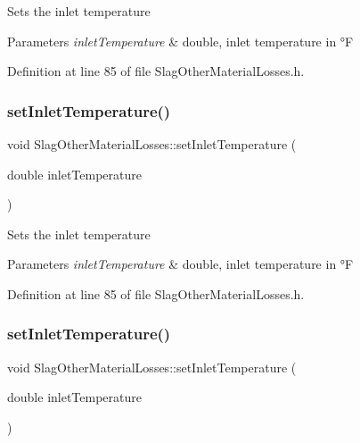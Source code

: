 Sets the inlet temperature 
\begin{DoxyParams}{Parameters}
{\em inlet\+Temperature} & double, inlet temperature in °F \\
\hline
\end{DoxyParams}


Definition at line 85 of file Slag\+Other\+Material\+Losses.\+h.

\mbox{\label{class_slag_other_material_losses_a47bb0a61de501e3e9b7bd2bf2651eb8c}} 
\subsubsection{\texorpdfstring{set\+Inlet\+Temperature()}{setInletTemperature()}\hspace{0.1cm}{\footnotesize\ttfamily [2/3]}}
{\footnotesize\ttfamily void Slag\+Other\+Material\+Losses\+::set\+Inlet\+Temperature (\begin{DoxyParamCaption}\item[{double}]{inlet\+Temperature }\end{DoxyParamCaption})\hspace{0.3cm}{\ttfamily [inline]}}

Sets the inlet temperature 
\begin{DoxyParams}{Parameters}
{\em inlet\+Temperature} & double, inlet temperature in °F \\
\hline
\end{DoxyParams}


Definition at line 85 of file Slag\+Other\+Material\+Losses.\+h.

\mbox{\label{class_slag_other_material_losses_a47bb0a61de501e3e9b7bd2bf2651eb8c}} 
\subsubsection{\texorpdfstring{set\+Inlet\+Temperature()}{setInletTemperature()}\hspace{0.1cm}{\footnotesize\ttfamily [3/3]}}
{\footnotesize\ttfamily void Slag\+Other\+Material\+Losses\+::set\+Inlet\+Temperature (\begin{DoxyParamCaption}\item[{double}]{inlet\+Temperature }\end{DoxyParamCaption})\hspace{0.3cm}{\ttfamily [inline]}}

